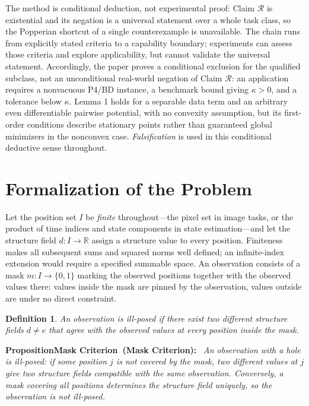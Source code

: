\documentclass[twoside,11pt]{article}
\newtheorem{defn}{Definition}
\newenvironment{uprop}[1][]{\par\medskip\noindent\textbf{Proposition\ifx\relax#1\relax\else\ (#1)\fi:}\ \itshape}{\par\medskip}
\begin{document}
The method is conditional deduction, not experimental proof: Claim $\mathcal{R}$ is existential and its negation is a universal statement over a whole task class, so the Popperian shortcut of a single counterexample \citep{popper1959} is unavailable. The chain runs from explicitly stated criteria to a capability boundary; experiments can assess those criteria and explore applicability, but cannot validate the universal statement. Accordingly, the paper proves a conditional exclusion for the qualified subclass, not an unconditional real-world negation of Claim $\mathcal{R}$: an application requires a nonvacuous P4/BD instance, a benchmark bound giving $\kappa>0$, and a tolerance below $\kappa$. Lemma 1 holds for a separable data term and an arbitrary even differentiable pairwise potential, with no convexity assumption, but its first-order conditions describe stationary points rather than guaranteed global minimizers in the nonconvex case. \emph{Falsification} is used in this conditional deductive sense throughout.

\section{Formalization of the Problem}
\label{ch:formalize}

Let the position set $I$ be \emph{finite} throughout---the pixel set in image tasks, or the product of time indices and state components in state estimation---and let the structure field $d : I \to \mathbb{R}$ assign a structure value to every position. Finiteness makes all subsequent sums and squared norms well defined; an infinite-index extension would require a specified summable space. An observation consists of a mask $m : I \to \{0,1\}$ marking the observed positions together with the observed values there: values inside the mask are pinned by the observation, values outside are under no direct constraint.

\begin{defn}
An observation is \emph{ill-posed} if there exist two different structure fields $d \neq e$ that agree with the observed values at every position inside the mask.
\end{defn}

\begin{uprop}[Mask Criterion]
An observation with a hole is ill-posed: if some position $j$ is not covered by the mask, two different values at $j$ give two structure fields compatible with the same observation. Conversely, a mask covering all positions determines the structure field uniquely, so the observation is not ill-posed.
\end{uprop}
\end{document}
